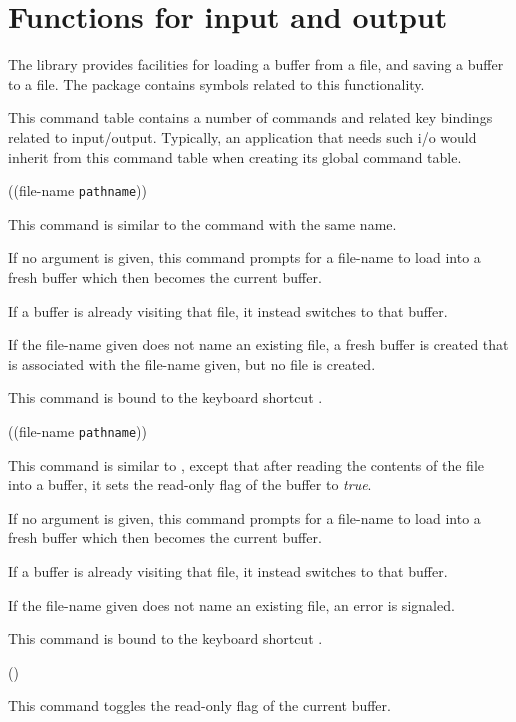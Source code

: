 \chapter{Functions for input and output}

The \sysname{} library provides facilities for loading a buffer from a
file, and saving a buffer to a file.  The  package
contains symbols related to this functionality.


This command table contains a number of commands and related key
bindings related to input/output.  Typically, an application that
needs such i/o would inherit from this command table when creating its
global command table.

 {((file-name \texttt{pathname}))}

This command is similar to the \emacs{} command with the same name.

If no argument is given, this command prompts for a file-name to load
into a fresh buffer which then becomes the current buffer.

If a buffer is already visiting that file, it instead switches to that
buffer.

If the file-name given does not name an existing file, a fresh buffer
is created that is associated with the file-name given, but no file is
created.

This command is bound to the keyboard shortcut .

 {((file-name \texttt{pathname}))}

This command is similar to , except that after
reading the contents of the file into a buffer, it sets the read-only
flag of the buffer to \emph{true}.

If no argument is given, this command prompts for a file-name to load
into a fresh buffer which then becomes the current buffer.

If a buffer is already visiting that file, it instead switches to that
buffer.

If the file-name given does not name an existing file, an error is
signaled.

This command is bound to the keyboard shortcut .

 {()}

This command toggles the read-only flag of the current buffer.

